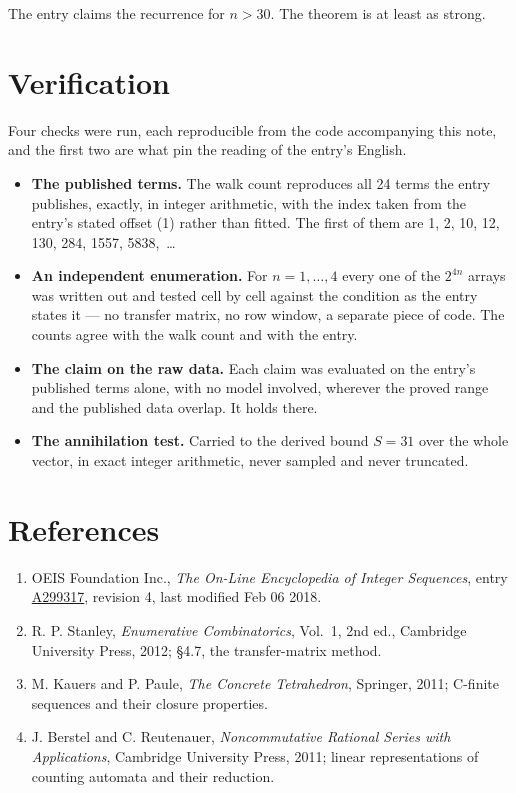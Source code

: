 \documentclass[11pt]{article}
\theoremstyle{definition}
\begin{document}
The entry claims the recurrence for $n > 30$. The theorem is at least as strong.

\section{Verification}

Four checks were run, each reproducible from the code accompanying this note, and the first two are what pin the reading of the entry's English.

\begin{itemize}

\item {\bfseries The published terms.} The walk count reproduces all 24 terms the entry publishes, exactly, in integer arithmetic, with the index taken from the entry's stated offset (1) rather than fitted. The first of them are 1, 2, 10, 12, 130, 284, 1557, 5838,~\dots

\item {\bfseries An independent enumeration.} For $n = 1,\dots,4$ every one of the $2^{4n}$ arrays was written out and tested cell by cell against the condition as the entry states it --- no transfer matrix, no row window, a separate piece of code. The counts agree with the walk count and with the entry.

\item {\bfseries The claim on the raw data.} Each claim was evaluated on the entry's published terms alone, with no model involved, wherever the proved range and the published data overlap. It holds there.

\item {\bfseries The annihilation test.} Carried to the derived bound $S = 31$ over the whole vector, in exact integer arithmetic, never sampled and never truncated.

\end{itemize}

\section{References}

\begin{enumerate}

\item OEIS Foundation Inc., \emph{The On-Line Encyclopedia of Integer Sequences}, entry \href{https://oeis.org/A299317}{A299317}, revision 4, last modified Feb 06 2018.

\item R. P. Stanley, \emph{Enumerative Combinatorics}, Vol.~1, 2nd ed., Cambridge University Press, 2012; \S4.7, the transfer-matrix method.

\item M. Kauers and P. Paule, \emph{The Concrete Tetrahedron}, Springer, 2011; C-finite sequences and their closure properties.

\item J. Berstel and C. Reutenauer, \emph{Noncommutative Rational Series with Applications}, Cambridge University Press, 2011; linear representations of counting automata and their reduction.

\end{enumerate}
\end{document}
